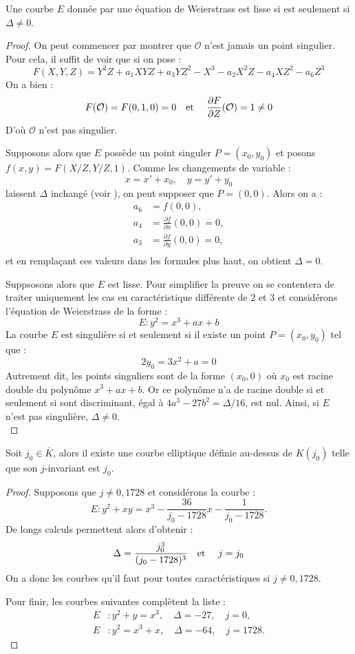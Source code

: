 \documentclass[a4paper]{article} %
\numberwithin{section}{part}
\numberwithin{equation}{section}
\newcommand\EO{\mathcal{O}}
\newcommand\etmath{\textup{\quad et \quad}}
\begin{document}
\begin{prop}
\label{def:lisse}
Une courbe $E$ donnée par une équation de Weierstrass est lisse si est seulement
si $\Delta \neq 0$.
\end{prop}
\begin{proof}
On peut commencer par montrer que $\EO$ n'est jamais un point singulier. Pour
cela, il suffit de voir que si on pose :
\[F(X,Y,Z) = Y^2Z + a_1XYZ + a_3YZ^2 - X^3 - a_2X^2Z - a_4XZ^2 - a_6Z^3\]
On a bien :
\[F(\EO) = F(0, 1, 0) = 0 \etmath \frac{\partial F}{\partial Z}(\EO) = 1 \neq
0\]
D'où $\EO$ n'est pas singulier.\par
Supposons alors que $E$ possède un point singuler $P = (x_0, y_0)$ et posons
$f(x,y) = F(X/Z,Y/Z,1)$. Comme les changements de variable :
\[x = x' + x_0, \quad y = y' + y_0\]
laissent $\Delta$ inchangé (voir \cite[Chap. III,p.~44-45]{Sil}), 
on peut supposer que $P = (0,0)$. Alors on a :
\begin{align*}
a_6 &= f(0,0),\\
a_4 &= \frac{\partial f}{\partial x}(0,0) = 0,\\
a_3 &= \frac{\partial f}{\partial y}(0,0) = 0,\\
\end{align*}
et en remplaçant ces valeurs dans les formules plus haut,
on obtient $\Delta = 0$.\par
Suppsosons alors que $E$ est lisse. Pour simplifier la preuve on se contentera
de traiter uniquement les cas en caractéristique différente de $2$ et $3$ et
considérons l'équation de Weierstrass de la forme :
\[E : y^2 = x^3 + ax + b\]
La courbe $E$ est singulière si et seulement si il existe un point $P = 
(x_0,y_0)$ tel que :
\[2y_0 = 3x^2 + a = 0\]
Autrement dit, les points singuliers sont de la forme $(x_0, 0)$ où $x_0$ est
racine double du polynôme $x^3 + ax + b$. Or ce polynôme n'a de racine double si
et seulement si sont discriminant, égal à $4a^3 - 27b^2 = \Delta/16$, est nul.
Ainsi, si $E$ n'est pas singulière, $\Delta\neq0$.\\
\end{proof}

\begin{prop}
Soit $j_0\in\bar{K}$, alors il existe une courbe elliptique définie au-dessus de
$K(j_0)$ telle que son $j$-invariant est $j_0$.
\end{prop}
\begin{proof}
Supposons que $j \neq 0, 1728$ et considérons la courbe :
\[E : y^2 + xy = x^3 - \frac{36}{j_0 - 1728}x - \frac{1}{j_0 - 1728}.\]
De longs calculs permettent alors d'obtenir :
\[\Delta = \frac{j_0^3}{(j_0 - 1728)^3} \etmath j = j_0\]
On a donc les courbes qu'il faut pour toutes caractéristiques si $j \neq 0,
1728$.\par
Pour finir, les courbes suivantes complètent la liste :
\begin{align*}
E &: y^2 + y = x^3, \quad \Delta = -27, \quad j = 0,\\
E &: y^2 = x^3 + x, \quad \Delta = -64, \quad j= 1728.
\end{align*}
\end{proof}
\end{document}
